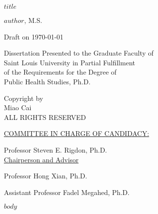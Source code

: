 \documentclass[12pt]{book}
\numberwithin{equation}{chapter}
\newenvironment{bottompar}{\par\vspace*{\fill}}{\clearpage}%
\begin{document}
\begin{titlepage}
\vspace{1cm}
\begin{center}
\linespread{2}\normalsize \bfseries \MakeUppercase{$title$}
\end{center}

\vspace{7cm}

\begin{center}
{$author$,  M.S.}
\vspace{0.3cm}

Draft on \today

\vspace{9cm}

Dissertation Presented to the Graduate Faculty of \\
Saint Louis University in Partial Fulfillment \\
of the Requirements for the Degree of\\
Public Health Studies, Ph.D.\\
\vspace{.5cm}
\the\year
\end{center}

\end{titlepage}
\clearpage


\begin{bottompar}
\begin{center}
\textcopyright \xspace Copyright by\\
Miao Cai \\
ALL RIGHTS RESERVED\\
\vspace{.5cm}
\the\year
\end{center}
\end{bottompar}

\vspace*{\fill}
\underline{COMMITTEE IN CHARGE OF CANDIDACY:}

\vspace{.3cm}
Professor Steven E. Rigdon, Ph.D.\\
{\setlength{\parindent}{20ex}  \indent \underline{Chairperson and Advisor}}

\vspace{.3cm}
Professor Hong Xian, Ph.D.

\vspace{.3cm}
Assistant Professor Fadel Megahed, Ph.D.
\vspace*{\fill}








$body$







\backmatter
\printindex
\end{document}
